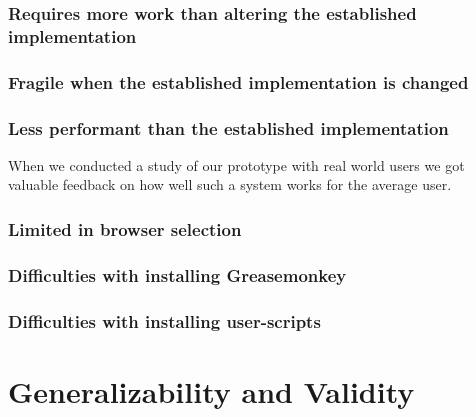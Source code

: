 \subsubsection{Requires more work than altering the established
  implementation}

\subsubsection{Fragile when the established implementation is changed}

\subsubsection{Less performant than the established implementation}

\parabreak

When we conducted a study of our prototype with real world users
we got valuable feedback on how well such a system works for the average user.

\subsubsection{Limited in browser selection}

\subsubsection{Difficulties with installing Greasemonkey}

\subsubsection{Difficulties with installing user-scripts}

\section{Generalizability and Validity}
